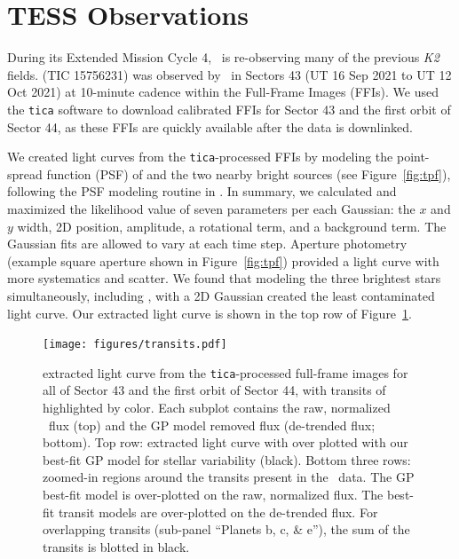 \documentclass[linenumbers,modern,twocolumn]{aastex631}
\begin{document}
\section{TESS Observations} \label{sec:observations}

During its Extended Mission Cycle 4, \tess\ is re-observing many of the previous \textit{K2} fields. \sname (TIC 15756231) was observed by \tess\ in Sectors 43 (UT 16 Sep 2021 to UT 12 Oct 2021) at 10-minute cadence within the Full-Frame Images (FFIs). We used the \texttt{tica} \citep{fausnaugh20} software to download calibrated FFIs for Sector 43 and the first orbit of Sector 44, as these FFIs are quickly available after the data is downlinked. 

We created light curves from the \texttt{tica}-processed FFIs by modeling the point-spread function (PSF) of \sname and the two nearby bright sources (see Figure~\ref{fig:tpf}), following the PSF modeling routine in \cite{feinstein19}. In summary, we calculated and maximized the likelihood value of seven parameters per each Gaussian: the $x$ and $y$ width, 2D position, amplitude, a rotational term, and a background term. The Gaussian fits are allowed to vary at each time step. Aperture photometry (example square aperture shown in Figure~\ref{fig:tpf}) provided a light curve with more systematics and scatter. We found that modeling the three brightest stars simultaneously, including \sname, with a 2D Gaussian created the least contaminated light curve. Our extracted light curve is shown in the top row of Figure~\ref{fig:transits}.

\begin{figure}[hbtp]
\begin{center}
\texttt{[image: figures/transits.pdf]}
\caption{\sname extracted light curve from the \texttt{tica}-processed full-frame images for all of Sector 43 and the first orbit of Sector 44, with transits of \allplanets highlighted by color. Each subplot contains the raw, normalized \tess\ flux (top) and the GP model removed flux (de-trended flux; bottom). Top row: extracted light curve with over plotted with our best-fit GP model for stellar variability (black). Bottom three rows: zoomed-in regions around the transits present in the \tess\ data. The GP best-fit model is over-plotted on the raw, normalized flux. The best-fit transit models are over-plotted on the de-trended flux. For overlapping transits (sub-panel ``Planets b, c, \& e''), the sum of the transits is blotted in black.} \label{fig:transits}
\end{center}
\end{figure}
\end{document}

